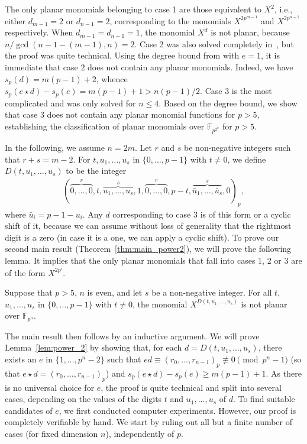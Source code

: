 \documentclass[12pt]{article}
\newcommand{\comp}[1]{\bar{#1}}
\newcommand{\F}{\mathbb{F}}
\newcommand{\wt}{s_p}
\begin{document}
The only planar monomials belonging to case 1 are those equivalent to $X^2$, i.e., either $d_{m-1} = 2$ or $d_{n-1} = 2$, corresponding to the monomials $X^{2p^{m-1}}$ and $X^{2p^{n-1}}$ respectively. When $d_{m-1} = d_{n-1} = 1$, the monomial $X^d$ is not planar, because $n/\gcd(n-1-(m-1),n)=2$. Case 2 was also solved completely in~\cite{DBLP:journals/ffa/CoulterL12}, but the proof was quite technical. Using the degree bound from  with $e = 1$, it is immediate that case 2 does not contain any planar monomials. Indeed, we have $\wt(d) = m(p-1) + 2$, whence $\wt(e \star d) - \wt(e) = m(p-1)+1 > n(p-1)/2$. Case 3 is the most complicated and was only solved for $n \leq 4$.  Based on the degree bound, we show that case 3 does not contain any planar monomial functions for $p>5$, establishing the classification of planar monomials over $\F_{p^{2^k}}$ for $p> 5$. 

In the following, we assume $n = 2m$. Let $r$ and $s$ be non-negative integers such that $r+s = m-2$. For $t, u_1,\dots,u_s$ in $\{0,\dots,p-1\}$ with $t\neq 0$, we define $D(t,u_1,\dots,u_s)$ to be the integer 
\begin{align}
\label{eq:general_form}
(\overbrace{0,\dots,0}^{r}, t, \overbrace{u_1,\dots,u_s}^{s},1,\overbrace{0,\dots,0}^{r},p-t, \overbrace{\comp{u}_1,\dots,\comp{u}_s}^s,0)_p,
\end{align} 
where $\comp{u}_i = p - 1 - u_i$.
Any $d$ corresponding to case 3 is of this form or a cyclic shift of it, because we can assume without loss of generality that the rightmost digit is a zero (in case it is a one, we can apply a cyclic shift). To prove our second main result (Theorem~\ref{thm:main_power2}), we will prove the following lemma. It implies that the only planar monomials that fall into cases 1, 2 or 3 are of the form $X^{2p^i}$. 

\begin{lemma}
\label{lem:power_2}
Suppose that $p>5$, $n$ is even, and let $s$ be a non-negative integer. For all $t$, $u_1,\dots,u_s$ in $\{0,\dots,p-1\}$ with $t \neq 0$, the monomial $X^{D(t,u_1,\dots,u_s)}$ is not planar over $\F_{p^n}$.
\end{lemma}
The main result then follows by an inductive argument. We will prove Lemma~\ref{lem:power_2} by showing that, for each $d = D(t,u_1,\dots,u_s)$, there exists an $e$ in $\{1,\dots,p^n-2\}$ such that $ed \equiv (r_0,\dots,r_{n-1})_p \not\equiv 0\pmod{p^n-1}$ (so that $e \star d = (r_0,\dots,r_{n-1})_p$) and $\wt(e \star d) - \wt(e) \geq m(p-1) + 1$. As there is no universal choice for $e$,
the proof is quite technical and split into several cases, depending on the values of the digits $t$ and $u_1,\dots,u_s$ of $d$. To find suitable candidates of $e$, we first conducted computer experiments. However, our proof is completely verifiable by hand. We start by ruling out all but a finite number of cases (for fixed dimension $n$), independently of $p$. 
\end{document}
